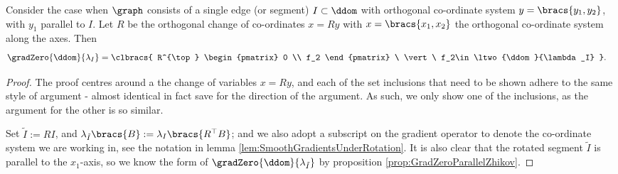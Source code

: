 \begin{prop} \label{prop:RotationOfEdgeGradients}
	Consider the case when $\graph$ consists of a single edge (or segment) $I\subset\ddom$ with orthogonal co-ordinate system $y=\bracs{y_1,y_2}$, with $y_1$ parallel to $I$.
	Let $R$ be the orthogonal change of co-ordinates $x=Ry$ with $x=\bracs{x_1,x_2}$ the orthogonal co-ordinate system along the axes.
	Then
	\begin{align*}
		\gradZero{\ddom}{\lambda_I} 
		&= \clbracs{ R^{\top} \begin{pmatrix} 0 \\ f_2 \end{pmatrix} \ \vert \ f_2\in\ltwo{\ddom}{\lambda_I} }.
	\end{align*}
\end{prop}
\begin{proof}
	The proof centres around a the change of variables $x=Ry$, and each of the set inclusions that need to be shown adhere to the same style of argument - almost identical in fact save for the direction of the argument.
	As such, we only show one of the inclusions, as the argument for the other is so similar. \newline
	
	Set $\tilde{I} := RI$, and $\lambda_{\tilde{I}}\bracs{B} := \lambda_{I}\bracs{R^{\top}B}$; and we also adopt a subscript on the gradient operator to denote the co-ordinate system we are working in, see the notation in lemma \ref{lem:SmoothGradientsUnderRotation}.
	It is also clear that the rotated segment $\tilde{I}$ is parallel to the $x_1$-axis, so we know the form of $\gradZero{\ddom}{\lambda_{\tilde{I}}}$ by proposition \ref{prop:GradZeroParallelZhikov}. \newline
	

\end{proof}
